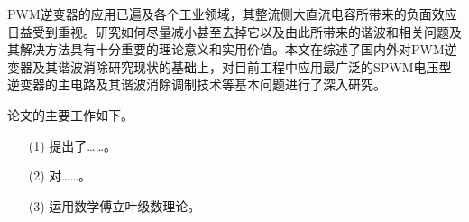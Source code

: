 \neepuconclusion%
\bodystyle%
PWM逆变器的应用已遍及各个工业领域，其整流侧大直流电容所带来的负面效应日益受到重视。研究如何尽量减小甚至去掉它以及由此所带来的谐波和相关问题及其解决方法具有十分重要的理论意义和实用价值。本文在综述了国内外对PWM逆变器及其谐波消除研究现状的基础上，对目前工程中应用最广泛的SPWM电压型逆变器的主电路及其谐波消除调制技术等基本问题进行了深入研究。\par
论文的主要工作如下。
\begin{itemize}[topsep=0pt,itemsep=0pt,parsep=0pt,leftmargin=1.5cm]
\item[(1)] 提出了……。
\item[(2)] 对……。
\item[(3)] 运用数学傅立叶级数理论。
\end{itemize}